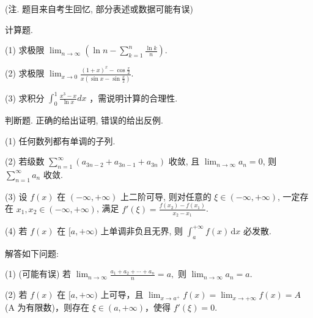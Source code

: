 (注. 题目来自考生回忆, 部分表述或数据可能有误)\par
计算题.\par
(1) 求极限 $\lim_{n\to \infty}\left(\ln n - \sum_{k = 1}^{n}\frac{\ln k}{n}\right)$.\par
(2) 求极限 $\lim_{x\to 0}\frac{(1 + x)^x - \cos\frac{x}{2}}{x(\sin x - \sin\frac{x}{2})}.$\par
(3) 求积分  $\int_{0}^{1}\frac{x^{3}-x}{\ln x}dx$ ，需说明计算的合理性.\par
判断题. 正确的给出证明, 错误的给出反例.\par
(1) 任何数列都有单调的子列.\par
(2) 若级数 $\sum_{n=1}^{\infty}\left(a_{3n-2} + a_{3n-1} + a_{3n}\right)$ 收敛, 且 $\lim_{n\to\infty}a_n = 0$, 则 $\sum_{n=1}^{\infty}a_n$ 收敛.\par
(3) 设 $f(x)$ 在 $(- \infty, + \infty)$ 上二阶可导, 则对任意的 $\xi \in (-\infty, + \infty)$, 一定存在 $x_1, x_2 \in (-\infty, + \infty)$, 满足 $f'(\xi) = \frac{f(x_2) - f(x_1)}{x_2 - x_1}$.\par
(4) 若 $f(x)$ 在 $[a, +\infty)$ 上单调非负且无界, 则 $\int_{a}^{+\infty} f(x) \, \mathrm{d}x$ 必发散.\par
解答如下问题:\par
(1) (可能有误) 若 $\lim_{n\to \infty}\frac{a_1 + a_2 + \cdots + a_n}{n} = a,$ 则 $\lim_{n\to \infty}a_n = a.$\par
(2) 若 $f(x)$ 在 $[a, +\infty)$ 上可导，且 $\lim_{x \to a^{+}} f(x) = \lim_{x \to +\infty} f(x) = A$ (A 为有限数)，则存在 $\xi \in (a, +\infty)$，使得 $f'(\xi) = 0$.\par
